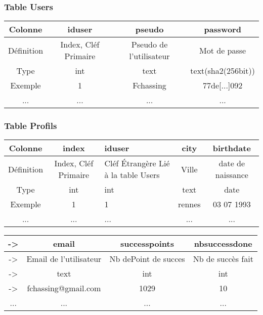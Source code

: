 \documentclass[a4paper,10pt]{article}
\begin{document}
\subsubsection{Table Users}

\begin{center}
\begin{tabular}{| c | c | c | c | }
\hline
Colonne & iduser & pseudo & password \\ \hline
Définition & Index, Cléf Primaire & Pseudo de l'utilisateur & Mot de passe\\ \hline
Type & int & text & text(sha2(256bit))\\ \hline
Exemple & 1 & Fchassing & 77de[...]092  \\ \hline
... & ... & ... & ... \\
\end{tabular}
\end{center}

\subsubsection{Table Profils}

\begin{center}
\begin{tabular}{| c | c | p{3cm} | c | c |}
\hline
Colonne & index &iduser & city & birthdate \\ \hline
Définition & Index, Cléf Primaire & Cléf \'Etrangère Lié à la table Users & Ville & date de naissance\\ \hline
Type & int & int & text & date\\ \hline
Exemple & 1 & 1 & rennes & 03 07 1993  \\ \hline
... & ... & ... & ... & ... \\
\end{tabular}
\end{center}


\begin{center}
\begin{tabular}{| c | c | c | c | }
\hline
-> & email & successpoints & nbsuccessdone\\ \hline
-> & Email de l'utilisateur & Nb dePoint de succes & Nb de succès fait\\ \hline
-> & text & int & int\\ \hline
-> & fchassing@gmail.com & 1029 & 10\\ \hline
... & ... & ... & ... \\
\end{tabular}
\end{center}
\end{document}
